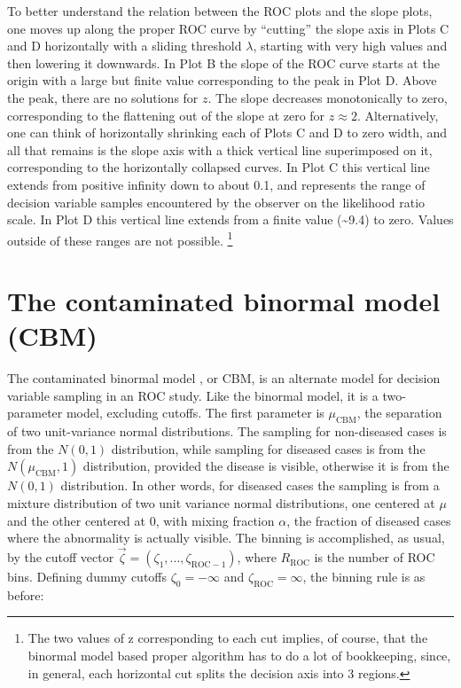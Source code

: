 \documentclass[
]{book}
\begin{document}
To better understand the relation between the ROC plots and the slope plots, one moves up along the proper ROC curve by ``cutting'' the slope axis in Plots C and D horizontally with a sliding threshold \(\lambda\), starting with very high values and then lowering it downwards. In Plot B the slope of the ROC curve starts at the origin with a large but finite value corresponding to the peak in Plot D. Above the peak, there are no solutions for \(z\). The slope decreases monotonically to zero, corresponding to the flattening out of the slope at zero for \(z \approx 2\). Alternatively, one can think of horizontally shrinking each of Plots C and D to zero width, and all that remains is the slope axis with a thick vertical line superimposed on it, corresponding to the horizontally collapsed curves. In Plot C this vertical line extends from positive infinity down to about 0.1, and represents the range of decision variable samples encountered by the observer on the likelihood ratio scale. In Plot D this vertical line extends from a finite value (\textasciitilde9.4) to zero. Values outside of these ranges are not possible. \footnote{The two values of z corresponding to each cut implies, of course, that the binormal model based proper algorithm has to do a lot of bookkeeping, since, in general, each horizontal cut splits the decision axis into 3 regions.}

\hypertarget{proper-roc-models-cbm}{%
\section{The contaminated binormal model (CBM)}\label{proper-roc-models-cbm}}

The contaminated binormal model \citep{dorfman2000contaminated1, dorfman2000contaminated2, dorfman2000contaminated3}, or CBM, is an alternate model for decision variable sampling in an ROC study. Like the binormal model, it is a two-parameter model, excluding cutoffs. The first parameter is \(\mu_\text{CBM}\), the separation of two unit-variance normal distributions. The sampling for non-diseased cases is from the \(N(0,1)\) distribution, while sampling for diseased cases is from the \(N(\mu_\text{CBM},1)\) distribution, provided the disease is visible, otherwise it is from the \(N(0,1)\) distribution. In other words, for diseased cases the sampling is from a mixture distribution of two unit variance normal distributions, one centered at \(\mu\) and the other centered at 0, with mixing fraction \(\alpha\), the fraction of diseased cases where the abnormality is actually visible. The binning is accomplished, as usual, by the cutoff vector \(\overrightarrow{\zeta}=\left( \zeta_1,...,\zeta_{\text{ROC}-1} \right)\), where \(R_\text{ROC}\) is the number of ROC bins. Defining dummy cutoffs \(\zeta_0=-\infty\) and \(\zeta_{\text{ROC}}=\infty\), the binning rule is as before:
\end{document}

